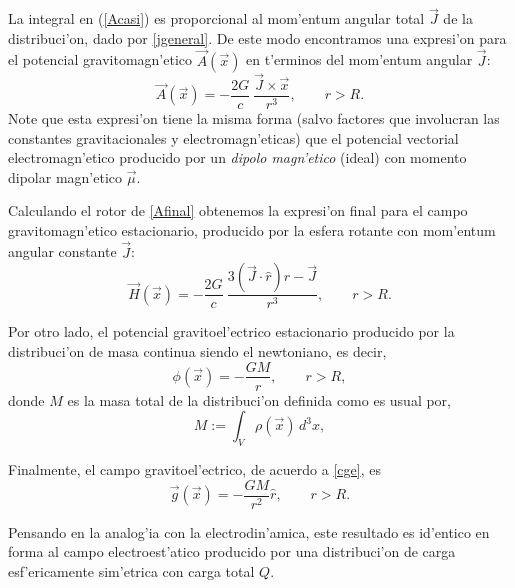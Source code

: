La integral en (\ref{Acasi}) es proporcional al mom'entum angular total $\vec{J}$ de la distribuci'on, dado por \eqref{jgeneral}. De este modo encontramos una expresi'on para el potencial gravitomagn'etico $\vec{A}(\vec{x})$ en t'erminos del mom'entum angular $\vec{J}$:
\begin{equation}\boxed{
\vec{A}(\vec{x})=-\frac{2G}{c}\ \frac{\vec{J}\times\vec{x}}{r^3},\qquad r>R.}\label{Afinal}
\end{equation}
Note que esta expresi'on tiene la misma forma (salvo factores que involucran las constantes gravitacionales y electromagn'eticas) que el potencial vectorial electromagn'etico producido por un \textit{dipolo magn'etico} (ideal) con momento dipolar magn'etico $\vec{\mu}$.

Calculando el rotor de \eqref{Afinal} obtenemos la expresi'on final para el campo gravitomagn'etico estacionario, producido por la esfera rotante con mom'entum angular constante $\vec{J}$:
\begin{equation}\boxed{
\vec{H}(\vec{x})=-\frac{2G}{c}\ \frac{3(\vec{J}\cdot\hat{r})\hat{r}-\vec{J}}{r^3},\qquad r>R.}\label{Hgravito}
\end{equation}

Por otro lado, el potencial gravitoel'ectrico estacionario producido por la distribuci'on de masa continua siendo el newtoniano, es decir,
\begin{equation}\boxed{
\phi(\vec{x})=-\frac{GM}{r},\qquad r>R,}\label{phifinal}
\end{equation}
donde $M$ es la masa total de la distribuci'on definida como es usual por,
\begin{equation}
M:=\int_V \rho (\vec{x})\, d^3x,\label{masatotal}
\end{equation}

Finalmente, el campo gravitoel'ectrico, de acuerdo a \eqref{cge}, es
\begin{equation}\boxed{
\vec{g}(\vec{x})=-\frac{GM}{r^2}\hat{r},\qquad r>R.}\label{ggravito}
\end{equation}

Pensando en la analog'ia con la electrodin'amica, este resultado es id'entico en forma al campo electroest'atico producido por una distribuci'on de carga esf'ericamente sim'etrica con carga total $Q$.

